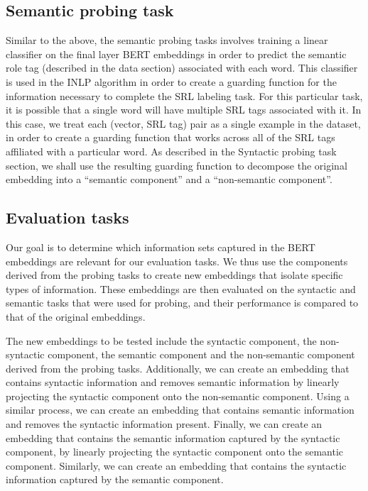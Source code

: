 \documentclass[11pt,a4paper]{article}
\begin{document}
\subsection{Semantic probing task}

Similar to the above, the semantic probing tasks involves training a linear classifier on the final layer BERT embeddings in order to predict the semantic role tag (described in the data section) associated with each word. This classifier is used in the INLP algorithm in order to create a guarding function for the information necessary to complete the SRL labeling task. For this particular task, it is possible that a single word will have multiple SRL tags associated with it. In this case, we treat each (vector, SRL tag) pair as a single example in the dataset, in order to create a guarding function that works across all of the SRL tags affiliated with a particular word. As described in the Syntactic probing task section, we shall use the resulting guarding function to decompose the original embedding into a ``semantic component'' and a ``non-semantic component''. 

\subsection{Evaluation tasks}

Our goal is to determine which information sets captured in the BERT embeddings are relevant for our evaluation tasks. We thus use the components derived from the probing tasks to create new embeddings that isolate specific types of information. These embeddings are then evaluated on the syntactic and semantic tasks that were used for probing, and their performance is compared to that of the original embeddings. 

The new embeddings to be tested include the syntactic component, the non-syntactic component, the semantic component and the non-semantic component derived from the probing tasks. Additionally, we can create an embedding that contains syntactic information and removes semantic information by linearly projecting the syntactic component onto the non-semantic component. Using a similar process, we can create an embedding that contains semantic information and removes the syntactic information present. Finally, we can create an embedding that contains the semantic information captured by the syntactic component, by linearly projecting the syntactic component onto the semantic component. Similarly, we can create an embedding that contains the syntactic information captured by the semantic component. 
\end{document}
